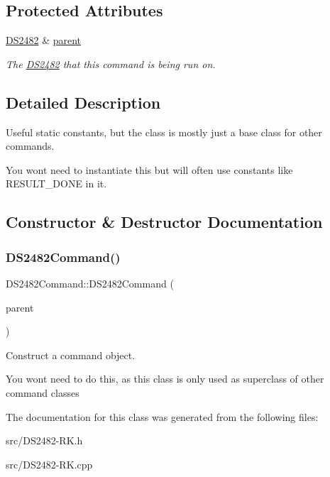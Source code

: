 \subsection*{Protected Attributes}
\begin{DoxyCompactItemize}
\item 
\mbox{\label{class_d_s2482_command_a54a41fb8a610ef2077f5e5377771aaf3}} 
\mbox{\hyperlink{class_d_s2482}{D\+S2482}} \& \mbox{\hyperlink{class_d_s2482_command_a54a41fb8a610ef2077f5e5377771aaf3}{parent}}
\begin{DoxyCompactList}\small\item\em The \mbox{\hyperlink{class_d_s2482}{D\+S2482}} that this command is being run on. \end{DoxyCompactList}\end{DoxyCompactItemize}


\subsection{Detailed Description}
Useful static constants, but the class is mostly just a base class for other commands. 

You won\textquotesingle{}t need to instantiate this but will often use constants like R\+E\+S\+U\+L\+T\+\_\+\+D\+O\+NE in it. 

\subsection{Constructor \& Destructor Documentation}
\mbox{\label{class_d_s2482_command_afafdd341bb8dbddf755a1ba2aaee79db}} 
\subsubsection{\texorpdfstring{D\+S2482\+Command()}{DS2482Command()}}
{\footnotesize\ttfamily D\+S2482\+Command\+::\+D\+S2482\+Command (\begin{DoxyParamCaption}\item[{\mbox{\hyperlink{class_d_s2482}{D\+S2482}} \&}]{parent }\end{DoxyParamCaption})}



Construct a command object. 

You won\textquotesingle{}t need to do this, as this class is only used as superclass of other command classes 

The documentation for this class was generated from the following files\+:\begin{DoxyCompactItemize}
\item 
src/D\+S2482-\/\+R\+K.\+h\item 
src/D\+S2482-\/\+R\+K.\+cpp\end{DoxyCompactItemize}
